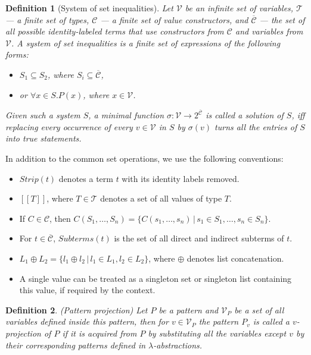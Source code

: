 \documentclass{IOS-Book-Article}     %
\newcommand{\sem}[1]{[\![#1]\!]}
\newtheorem{Def}{Definition}
\begin{document}
\begin{Def}[System of set inequalities]
Let $\mathcal{V}$ be an infinite set of variables, $\mathcal{T}$ --- a finite set of types, $\mathcal{C}$ --- a finite set of value constructors, and $\overline{\mathcal{C}}$ --- the set of all possible identity-labeled terms that use constructors from $\mathcal{C}$ and variables from $\mathcal{V}$.
A \emph{system of set inequalities} is a finite set of expressions of the following forms:
\begin{itemize}
\item $S_1 \subseteq S_2$, where $S_i \subseteq \overline{\mathcal{C}}$,
\item or $\forall x \in S. P(x)$, where $x \in \mathcal{V}$.
\end{itemize}
Given such a system $S$, a minimal function $\sigma : \mathcal{V}  \rightarrow 2^{\overline{\mathcal{C}}}$ is called a \emph{solution} of $S$, iff replacing every occurrence of every $v \in \mathcal{V}$ in $S$ by $\sigma(v)$ turns all the entries of $S$ into true statements.
\end{Def}
In addition to the common set operations, we use the following conventions:
\begin{itemize}
	\item $Strip(t)$ denotes a term $t$ with its identity labels removed.
	\item $\sem{T}$, where $T \in \mathcal{T}$ denotes a set of all values of type $T$.
	\item If $C \in \mathcal{C}$, then $C(S_1, \ldots, S_n) = \{C(s_1, \ldots, s_n) \,|\, s_1 \in S_1, \ldots, s_n \in S_n\}$.
	\item For $t \in \overline{\mathcal{C}}$, $Subterms(t)$ is the set of all direct and indirect subterms of $t$.
	\item $L_1 \oplus L_2 = \{l_1 \oplus l_2 \,|\, l_1 \in L_1, l_2 \in L_2\}$, where $\oplus$ denotes list concatenation.
	\item A single value can be treated as a singleton set or singleton list containing this value, if required by the context.
\end{itemize}

\begin{Def}(Pattern projection) Let $P$ be a pattern and $\mathcal{V}_P$ be a set of all variables defined inside this pattern, then for $v \in \mathcal{V}_P$ the pattern $P_v$ is called a \emph{$v$-projection} of $P$ if it is acquired from $P$ by substituting all the variables except $v$ by their corresponding patterns defined in $\lambda$-abstractions.
\end{Def}
\end{document}

